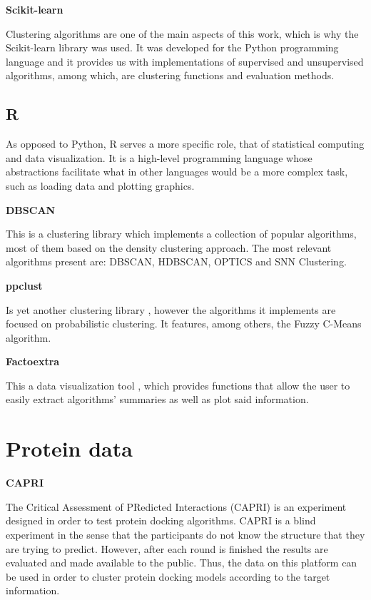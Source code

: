 \medskip
\textbf{Scikit-learn}

Clustering algorithms are one of the main aspects of this work, which is why the Scikit-learn \cite{scikitlearn} library was used. It was developed for the Python programming language and it provides us with implementations of supervised and unsupervised algorithms, among which, are clustering functions and evaluation methods.

\subsection{R}

As opposed to Python, R serves a more specific role, that of statistical computing and data visualization. It is a high-level programming language whose abstractions facilitate what in other languages would be a more complex task, such as loading data and plotting graphics.

\textbf{DBSCAN}

This is a clustering library \cite{hahsler2017dbscan} which implements a collection of popular algorithms, most of them based on the density clustering approach. The most relevant algorithms present are: \gls{DBSCAN}, HDBSCAN, OPTICS and \gls{SNN} Clustering.

\medskip
\textbf{ppclust}

Is yet another clustering library \cite{ppclust2018}, however the algorithms it implements are focused on probabilistic clustering. It features, among others, the Fuzzy C-Means algorithm.

\medskip
\textbf{Factoextra}

This a data visualization tool \cite{kassambara2016factoextra}, which provides functions that allow the user to easily extract algorithms’ summaries as well as plot said information.

\section{Protein data}

\medskip
\textbf{CAPRI}

The Critical Assessment of PRedicted Interactions (CAPRI) \cite{janin2005assessing} is an experiment designed in order to test protein docking algorithms. CAPRI is a blind experiment in the sense that the participants do not know the structure that they are trying to predict. However, after each round is finished the results are evaluated and made available to the public. Thus, the data on this platform can be used in order to cluster protein docking models according to the target information.


